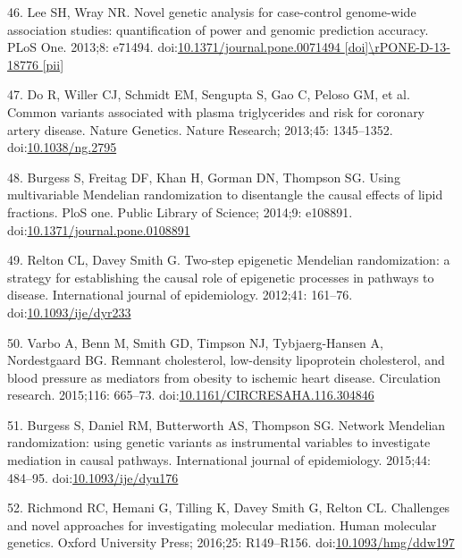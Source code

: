 \documentclass[]{article}
\begin{document}
\hypertarget{ref-Lee2013c}{}
46. Lee SH, Wray NR. Novel genetic analysis for case-control genome-wide
association studies: quantification of power and genomic prediction
accuracy. PLoS One. 2013;8: e71494.
doi:\href{https://doi.org/10.1371/journal.pone.0071494\%20\%5Bdoi\%5D/rPONE-D-13-18776\%20\%5Bpii\%5D}{10.1371/journal.pone.0071494 {[}doi{]}\textbackslash{}rPONE-D-13-18776 {[}pii{]}}

\hypertarget{ref-Do2013}{}
47. Do R, Willer CJ, Schmidt EM, Sengupta S, Gao C, Peloso GM, et al.
Common variants associated with plasma triglycerides and risk for
coronary artery disease. Nature Genetics. Nature Research; 2013;45:
1345--1352. doi:\href{https://doi.org/10.1038/ng.2795}{10.1038/ng.2795}

\hypertarget{ref-Burgess2014a}{}
48. Burgess S, Freitag DF, Khan H, Gorman DN, Thompson SG. Using
multivariable Mendelian randomization to disentangle the causal effects
of lipid fractions. PloS one. Public Library of Science; 2014;9:
e108891.
doi:\href{https://doi.org/10.1371/journal.pone.0108891}{10.1371/journal.pone.0108891}

\hypertarget{ref-Relton2012}{}
49. Relton CL, Davey Smith G. Two-step epigenetic Mendelian
randomization: a strategy for establishing the causal role of epigenetic
processes in pathways to disease. International journal of epidemiology.
2012;41: 161--76.
doi:\href{https://doi.org/10.1093/ije/dyr233}{10.1093/ije/dyr233}

\hypertarget{ref-Varbo2015}{}
50. Varbo A, Benn M, Smith GD, Timpson NJ, Tybjaerg-Hansen A,
Nordestgaard BG. Remnant cholesterol, low-density lipoprotein
cholesterol, and blood pressure as mediators from obesity to ischemic
heart disease. Circulation research. 2015;116: 665--73.
doi:\href{https://doi.org/10.1161/CIRCRESAHA.116.304846}{10.1161/CIRCRESAHA.116.304846}

\hypertarget{ref-Burgess2015}{}
51. Burgess S, Daniel RM, Butterworth AS, Thompson SG. Network Mendelian
randomization: using genetic variants as instrumental variables to
investigate mediation in causal pathways. International journal of
epidemiology. 2015;44: 484--95.
doi:\href{https://doi.org/10.1093/ije/dyu176}{10.1093/ije/dyu176}

\hypertarget{ref-Richmond2016}{}
52. Richmond RC, Hemani G, Tilling K, Davey Smith G, Relton CL.
Challenges and novel approaches for investigating molecular mediation.
Human molecular genetics. Oxford University Press; 2016;25: R149--R156.
doi:\href{https://doi.org/10.1093/hmg/ddw197}{10.1093/hmg/ddw197}
\end{document}
